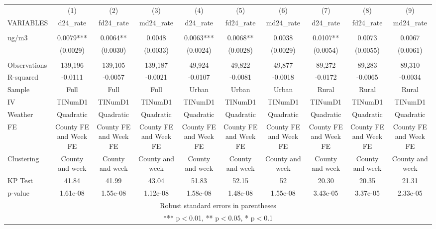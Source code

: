 \begin{tabular}{lccccccccc} \hline
 & (1) & (2) & (3) & (4) & (5) & (6) & (7) & (8) & (9) \\
VARIABLES & d24\_rate & fd24\_rate & md24\_rate & d24\_rate & fd24\_rate & md24\_rate & d24\_rate & fd24\_rate & md24\_rate \\ \hline
 &  &  &  &  &  &  &  &  &  \\
ug/m3 & 0.0079*** & 0.0064** & 0.0048 & 0.0063*** & 0.0068** & 0.0038 & 0.0107** & 0.0073 & 0.0067 \\
 & (0.0029) & (0.0030) & (0.0033) & (0.0024) & (0.0028) & (0.0029) & (0.0054) & (0.0055) & (0.0061) \\
 &  &  &  &  &  &  &  &  &  \\
Observations & 139,196 & 139,105 & 139,187 & 49,924 & 49,822 & 49,877 & 89,272 & 89,283 & 89,310 \\
R-squared & -0.0111 & -0.0057 & -0.0021 & -0.0107 & -0.0081 & -0.0018 & -0.0172 & -0.0065 & -0.0034 \\
Sample & Full & Full & Full & Urban & Urban & Urban & Rural & Rural & Rural \\
IV & TINumD1 & TINumD1 & TINumD1 & TINumD1 & TINumD1 & TINumD1 & TINumD1 & TINumD1 & TINumD1 \\
Weather & Quadratic & Quadratic & Quadratic & Quadratic & Quadratic & Quadratic & Quadratic & Quadratic & Quadratic \\
FE & County FE and Week FE & County FE and Week FE & County FE and Week FE & County FE and Week FE & County FE and Week FE & County FE and Week FE & County FE and Week FE & County FE and Week FE & County FE and Week FE \\
Clustering & County and week & County and week & County and week & County and week & County and week & County and week & County and week & County and week & County and week \\
KP Test & 41.84 & 41.99 & 43.04 & 51.83 & 52.15 & 52 & 20.30 & 20.35 & 21.31 \\
 p-value & 1.61e-08 & 1.55e-08 & 1.12e-08 & 1.58e-08 & 1.48e-08 & 1.55e-08 & 3.43e-05 & 3.37e-05 & 2.33e-05 \\ \hline
\multicolumn{10}{c}{ Robust standard errors in parentheses} \\
\multicolumn{10}{c}{ *** p$<$0.01, ** p$<$0.05, * p$<$0.1} \\
\end{tabular}

